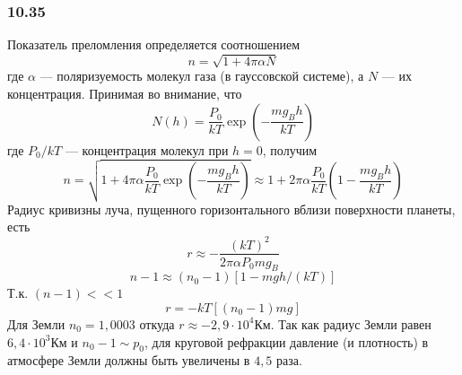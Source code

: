 \subsubsection*{10.35}
Показатель преломления определяется соотношением
\begin{equation*}
	n = \sqrt{1 + 4 \pi \alpha N}
\end{equation*}
где $\alpha$ --- поляризуемость молекул газа (в гауссовской системе), а $N$ --- их концентрация. Принимая во внимание, что 
\begin{equation*}
	N(h) = \frac{P_0}{kT}\exp \left( -\frac{mg_Bh}{kT}\right) 
\end{equation*}
где $P_0 / kT$ --- концентрация молекул при $h = 0$, получим
\begin{equation*}
	n = \sqrt{1+ 4\pi \alpha \frac{P_0}{kT} \exp \left( -\frac{mg_Bh}{kT}\right) } \approx 1 + 2\pi \alpha \frac{P_0}{kT} \left( 1 - \frac{mg_Bh}{kT}\right) 
\end{equation*}
Радиус кривизны луча, пущенного горизонтального вблизи поверхности планеты, есть
\begin{equation*}
	r \approx - \frac{(kT)^2}{2\pi \alpha P_0 m g_B}
\end{equation*}
\begin{equation*}
	n - 1 \approx (n_0 - 1) \left[1 - mgh/(kT)\right]
\end{equation*}
Т.к. $(n-1) << 1$
\begin{equation*}
	r = -kT \left[(n_0 - 1)mg\right]
\end{equation*}
Для Земли $n_0 = 1,0003$ откуда $r \approx -2,9 \cdot 10^4 Км$. Так как радиус Земли равен $6,4 \cdot 10^3 Км$ и $n_0 -1 \sim p_0$, для круговой рефракции давление (и плотность) в атмосфере Земли должны быть увеличены в $4,5$ раза.